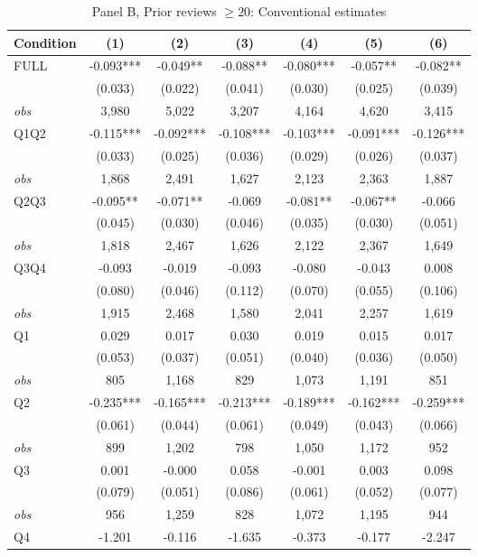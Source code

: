 \begin{table}[!htbp]
\centering
\caption{Panel B, Prior reviews $\geq 20$: Conventional estimates}
\label{tab:trim00:b:prior_reviews_ge20}
\small
\begin{tabular}{lcccccc}
\toprule
Condition & (1) & (2) & (3) & (4) & (5) & (6) \\
\midrule
FULL & -0.093*** & -0.049** & -0.088** & -0.080*** & -0.057** & -0.082** \\
 & (0.033) & (0.022) & (0.041) & (0.030) & (0.025) & (0.039) \\
\textit{obs} & 3,980 & 5,022 & 3,207 & 4,164 & 4,620 & 3,415 \\
Q1Q2 & -0.115*** & -0.092*** & -0.108*** & -0.103*** & -0.091*** & -0.126*** \\
 & (0.033) & (0.025) & (0.036) & (0.029) & (0.026) & (0.037) \\
\textit{obs} & 1,868 & 2,491 & 1,627 & 2,123 & 2,363 & 1,887 \\
Q2Q3 & -0.095** & -0.071** & -0.069 & -0.081** & -0.067** & -0.066 \\
 & (0.045) & (0.030) & (0.046) & (0.035) & (0.030) & (0.051) \\
\textit{obs} & 1,818 & 2,467 & 1,626 & 2,122 & 2,367 & 1,649 \\
Q3Q4 & -0.093 & -0.019 & -0.093 & -0.080 & -0.043 & 0.008 \\
 & (0.080) & (0.046) & (0.112) & (0.070) & (0.055) & (0.106) \\
\textit{obs} & 1,915 & 2,468 & 1,580 & 2,041 & 2,257 & 1,619 \\
Q1 & 0.029 & 0.017 & 0.030 & 0.019 & 0.015 & 0.017 \\
 & (0.053) & (0.037) & (0.051) & (0.040) & (0.036) & (0.050) \\
\textit{obs} &   805 & 1,168 &   829 & 1,073 & 1,191 &   851 \\
Q2 & -0.235*** & -0.165*** & -0.213*** & -0.189*** & -0.162*** & -0.259*** \\
 & (0.061) & (0.044) & (0.061) & (0.049) & (0.043) & (0.066) \\
\textit{obs} &   899 & 1,202 &   798 & 1,050 & 1,172 &   952 \\
Q3 & 0.001 & -0.000 & 0.058 & -0.001 & 0.003 & 0.098 \\
 & (0.079) & (0.051) & (0.086) & (0.061) & (0.052) & (0.077) \\
\textit{obs} &   956 & 1,259 &   828 & 1,072 & 1,195 &   944 \\
Q4 & -1.201 & -0.116 & -1.635 & -0.373 & -0.177 & -2.247 \\

\end{tabular}
\end{table}
